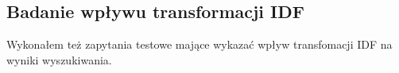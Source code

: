 \documentclass{article}
\begin{document}
        \subsection{Badanie wpływu transformacji IDF}
            Wykonałem też zapytania testowe mające wykazać wpływ transfomacji IDF na wyniki wyszukiwania.
            \begin{figure}[h!]
            \centering

\end{figure}
\end{document}

